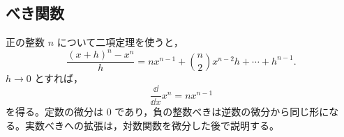 \subsection{べき関数}
正の整数 $n$ について二項定理を使うと，
\[
 \frac{(x+h)^n-x^n}{h}
 =nx^{n-1}+\binom n2x^{n-2}h+\cdots+h^{n-1}.
\]
$h\to0$ とすれば，
\[
 \frac{\dd}{\dd x}x^n=nx^{n-1}
\]
を得る。定数の微分は $0$ であり，負の整数べきは逆数の微分から同じ形になる。実数べきへの拡張は，対数関数を微分した後で説明する。

